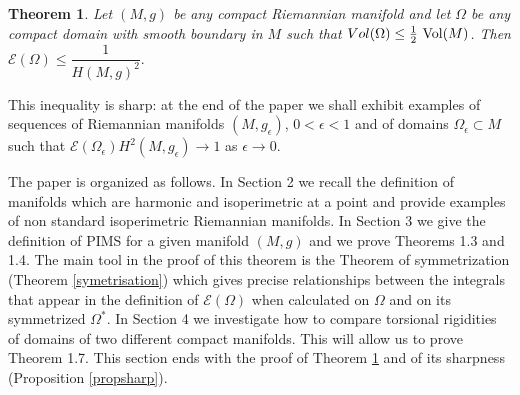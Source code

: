 \documentclass[11pt, reqno]{amsart}
\newtheorem{theoreme}{Theorem}[section]
\theoremstyle{plain}
\begin{document}
\begin{theoreme}\label{cheeger}
Let $(M,g)$ be any compact Riemannian manifold and  let $\Omega$ be any compact 
domain with smooth boundary in $M$ such that  $Vol (\Omega) \le \frac{1}{2} {\rm \ Vol} (M)$.
Then ${\mathcal E} (\Omega) \le  \dfrac{1}{H(M,g)^2} .$\\
\end{theoreme}

This inequality is sharp:  at the end of the paper we shall exhibit examples of sequences of  Riemannian manifolds $(M, g_\epsilon)$, $0<\epsilon <1$ 
and of domains $\Omega_\epsilon \subset M$ such that ${\mathcal E} (\Omega_\epsilon)H^2(M , g_\epsilon) \rightarrow 1$  as $\epsilon \rightarrow 0.$ 

\vskip 0.3cm

The paper is organized as follows.
In Section 2 we recall the definition of manifolds which are harmonic and  isoperimetric at a point and provide examples of non standard isoperimetric Riemannian manifolds.
 In Section 3 we give the definition of PIMS for a given manifold $(M,g)$ and we prove Theorems 1.3 and 1.4. 
The main tool in the proof of this theorem is the Theorem of symmetrization (Theorem \ref{symetrisation}) which 
 gives precise relationships between the integrals that appear in the definition of ${\mathcal E} (\Omega)$ when calculated on $\Omega$ and on its symmetrized $\Omega^*$. 
In Section 4 we investigate how to compare torsional rigidities of domains of two different compact manifolds. This will allow us to prove Theorem 1.7. This section  ends with the proof of Theorem \ref{cheeger} and of its sharpness  (Proposition \ref{propsharp}).
\end{document}
